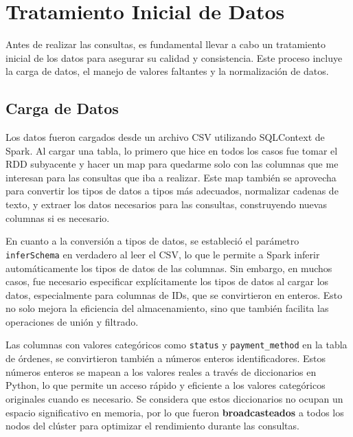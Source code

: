 \section{Tratamiento Inicial de Datos}
\label{sec:tratamiento_inicial_de_datos}

Antes de realizar las consultas, es fundamental llevar a cabo un tratamiento inicial de los datos para asegurar su calidad y consistencia. Este proceso incluye la carga de datos, el manejo de valores faltantes y la normalización de datos.

\subsection{Carga de Datos}

Los datos fueron cargados desde un archivo CSV utilizando SQLContext de Spark. Al cargar una tabla, lo primero que hice en todos los casos fue tomar el RDD subyacente y hacer un map para quedarme solo con las columnas que me interesan para las consultas que iba a realizar. Este map también se aprovecha para convertir los tipos de datos a tipos más adecuados, normalizar cadenas de texto, y extraer los datos necesarios para las consultas, construyendo nuevas columnas si es necesario.

En cuanto a la conversión a tipos de datos, se estableció el parámetro \texttt{inferSchema} en verdadero al leer el CSV, lo que le permite a Spark inferir automáticamente los tipos de datos de las columnas. Sin embargo, en muchos casos, fue necesario especificar explícitamente los tipos de datos al cargar los datos, especialmente para columnas de IDs, que se convirtieron en enteros. Esto no solo mejora la eficiencia del almacenamiento, sino que también facilita las operaciones de unión y filtrado. 

Las columnas con valores categóricos como \texttt{status} y \texttt{payment\_method} en la tabla de órdenes, se convirtieron también a números enteros identificadores. Estos números enteros se mapean a los valores reales a través de diccionarios en Python, lo que permite un acceso rápido y eficiente a los valores categóricos originales cuando es necesario. Se considera que estos diccionarios no ocupan un espacio significativo en memoria, por lo que fueron \textbf{broadcasteados} a todos los nodos del clúster para optimizar el rendimiento durante las consultas.
